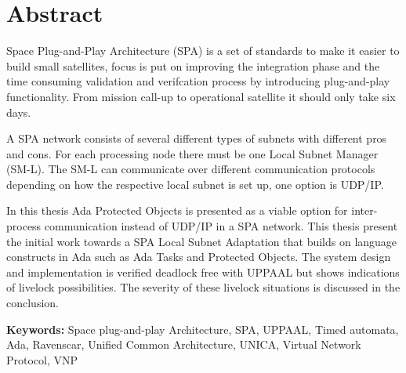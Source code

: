 \chapter*{Abstract}
\thispagestyle{empty} %
Space Plug-and-Play Architecture (SPA) is a set of standards to make it easier
to build small satellites, focus is put on improving the integration phase and
the time consuming validation and verifcation process by introducing
plug-and-play functionality. From mission call-up to operational satellite it
should only take six days.

A SPA network consists of several different types of subnets with different
pros and cons. For each processing node there must be one Local Subnet Manager
(SM-L). The SM-L can communicate over different communication protocols
depending on how the respective local subnet is set up, one option is UDP/IP.

In this thesis Ada Protected Objects is presented as a viable option for
inter-process communication instead of UDP/IP in a SPA network. This thesis
present the initial work towards a SPA Local Subnet Adaptation that builds on
language constructs in Ada such as Ada Tasks and Protected Objects.  The system
design and implementation is verified deadlock free with UPPAAL but shows
indications of livelock possibilities. The severity of these livelock
situations is discussed in the conclusion.

\textbf{Keywords:} Space plug-and-play Architecture, SPA, UPPAAL, Timed
automata, Ada, Ravenscar, Unified Common Architecture, UNICA, Virtual Network
Protocol, VNP
